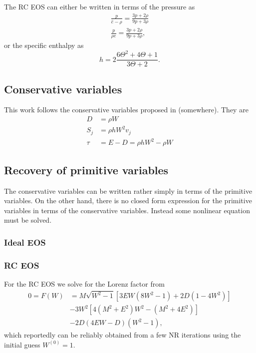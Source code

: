 \documentclass{article}
\begin{document}
The RC EOS can either be written in terms of the pressure as
\begin{align}
  \frac{p}{\hat{e} - \rho} = \frac{3p + 2\rho}{9p + 3\rho} \\
  \frac{p}{\rho e} = \frac{3p + 2\rho}{9p + 3\rho},
\end{align}
or the specific enthalpy as
\begin{equation}
  h = 2\frac{6\Theta^2 + 4\Theta + 1}{3\Theta + 2}.
\end{equation}

\subsection{Conservative variables}
This work follows the conservative variables proposed in (somewhere). They are
\begin{align}
  D &= \rho W \\
  S_j &= \rho h W^2 v_j \\
  \tau &= E - D = \rho h W^2 - \rho W
\end{align}

\subsection{Recovery of primitive variables}
The conservative variables can be written rather simply in terms of the primitive variables. On the other hand, there is no closed form expression for the primitive variables in terms of the conservative variables. Instead some nonlinear equation must be solved.

\subsubsection{Ideal EOS}

\subsubsection{RC EOS}
For the RC EOS we solve for the Lorenz factor from
\begin{align}
  0 = F(W) & = M\sqrt{W^2 - 1}\left[3EW\left(8W^2 - 1\right) + 2D\left(1 - 4W^2\right)\right] \nonumber \\
           & - 3W^2\left[4\left(M^2 + E^2\right)W^2 - \left(M^2 + 4E^2\right)\right] \\
           & - 2D\left(4EW - D\right)\left(W^2 - 1\right), \nonumber
\end{align}
which reportedly can be reliably obtained from a few NR iterations using the initial guess $W^{(0)} = 1$.
\end{document}
